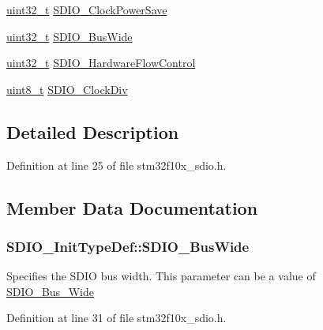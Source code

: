 \begin{DoxyCompactItemize}
\item 
\hyperlink{_p_e___types_8h_a33594304e786b158f3fb30289278f5af}{uint32\+\_\+t} \hyperlink{struct_s_d_i_o___init_type_def_ac236cc5a376a65b9de64a31dab816364}{S\+D\+I\+O\+\_\+\+Clock\+Power\+Save}
\item 
\hyperlink{_p_e___types_8h_a33594304e786b158f3fb30289278f5af}{uint32\+\_\+t} \hyperlink{struct_s_d_i_o___init_type_def_a0540529f615c2b29933b442bc326f0a7}{S\+D\+I\+O\+\_\+\+Bus\+Wide}
\item 
\hyperlink{_p_e___types_8h_a33594304e786b158f3fb30289278f5af}{uint32\+\_\+t} \hyperlink{struct_s_d_i_o___init_type_def_a5f57f8aca913de9aed47ef708c05f34f}{S\+D\+I\+O\+\_\+\+Hardware\+Flow\+Control}
\item 
\hyperlink{_p_e___types_8h_aba7bc1797add20fe3efdf37ced1182c5}{uint8\+\_\+t} \hyperlink{struct_s_d_i_o___init_type_def_a4166ee534e6cf8ac2c6a6a03bec45b06}{S\+D\+I\+O\+\_\+\+Clock\+Div}
\end{DoxyCompactItemize}


\subsection{Detailed Description}


Definition at line 25 of file stm32f10x\+\_\+sdio.\+h.



\subsection{Member Data Documentation}
\subsubsection[{\texorpdfstring{S\+D\+I\+O\+\_\+\+Bus\+Wide}{SDIO_BusWide}}]{ S\+D\+I\+O\+\_\+\+Init\+Type\+Def\+::\+S\+D\+I\+O\+\_\+\+Bus\+Wide}\hypertarget{struct_s_d_i_o___init_type_def_a954fed94888ea6ec96c2c2faed4cb594}{}\label{struct_s_d_i_o___init_type_def_a954fed94888ea6ec96c2c2faed4cb594}
Specifies the S\+D\+IO bus width. This parameter can be a value of \hyperlink{group___s_d_i_o___bus___wide}{S\+D\+I\+O\+\_\+\+Bus\+\_\+\+Wide} 

Definition at line 31 of file stm32f10x\+\_\+sdio.\+h.

